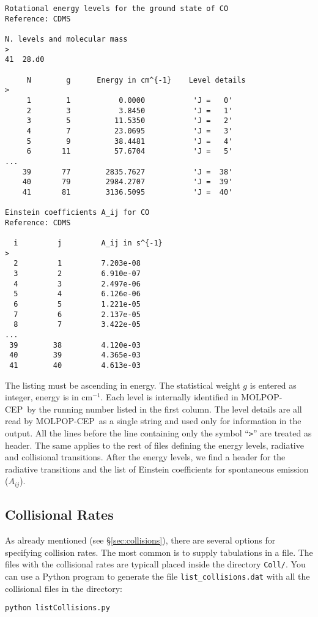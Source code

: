 \documentclass[12pt]{article}
\def\M{MOLPOP-CEP}
\begin{document}
\begin{verbatim}
Rotational energy levels for the ground state of CO
Reference: CDMS

N. levels and molecular mass
>
41  28.d0

     N        g      Energy in cm^{-1}    Level details
>
     1        1           0.0000           'J =   0'
     2        3           3.8450           'J =   1'
     3        5          11.5350           'J =   2'
     4        7          23.0695           'J =   3'
     5        9          38.4481           'J =   4'
     6       11          57.6704           'J =   5'
...
    39       77        2835.7627           'J =  38'
    40       79        2984.2707           'J =  39'
    41       81        3136.5095           'J =  40'

Einstein coefficients A_ij for CO
Reference: CDMS

  i         j         A_ij in s^{-1}
>
  2         1         7.203e-08
  3         2         6.910e-07
  4         3         2.497e-06
  5         4         6.126e-06
  6         5         1.221e-05
  7         6         2.137e-05
  8         7         3.422e-05
...
 39        38         4.120e-03
 40        39         4.365e-03
 41        40         4.613e-03
\end{verbatim}
The listing must be ascending in energy.  The statistical weight $g$ is entered
as integer, energy is in cm$^{-1}$. Each level is internally identified in \M\
by the running number listed in the first column. The level details are all
read by \M\ as a single string and used only for information in the output.
All the lines before the line containing only the symbol ``\texttt{>}'' are
treated as header. The same applies to the rest of files defining the energy
levels, radiative and collisional transitions.
After the energy levels, we find a header for the radiative transitions
and the list of Einstein coefficients for spontaneous emission ($A_{ij}$).


\subsection{Collisional Rates}
As already mentioned (see \S\ref{sec:collisions}), there are several options
for specifying collision rates. The most common is to supply tabulations in a
file. The files with the collisional rates are typicall placed inside the directory 
\texttt{Coll/}. You can use a Python program to generate the file \texttt{list\_collisions.dat}
with all the collisional files in the directory:
\begin{verbatim}
python listCollisions.py
\end{verbatim}
\end{document}
